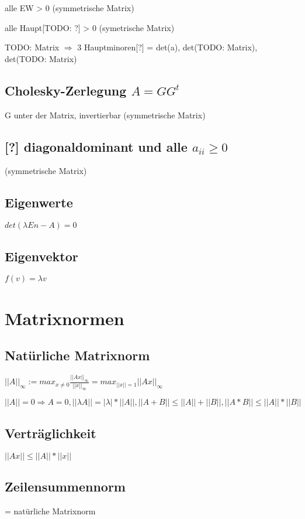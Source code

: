 \documentclass[12pt,a4paper]{article} %
\begin{document}
			alle EW > 0 (symmetrische Matrix)
			
			alle Haupt[TODO: ?] > 0 (symetrische Matrix)
			
			TODO: Matrix 	$\Rightarrow$ 3 Hauptminoren[?] = det(a), det(TODO: Matrix), det(TODO: Matrix)
			
			\subsection{Cholesky-Zerlegung $A = GG^t$}
			G unter der Matrix, invertierbar (symmetrische Matrix)
			
			\subsection{[?] diagonaldominant und alle $a_{ii} \ge 0$}
			(symmetrische Matrix)
			
			\subsection{Eigenwerte}
			$det(\lambda En - A) = 0$
			
			\subsection{Eigenvektor}
			$f(v) = \lambda v$
			
		\newpage
		
		\section{Matrixnormen}
		
		\subsection{Natürliche Matrixnorm}
		
		$||A||_\infty := max_{x \ne 0} \frac{||Ax||_\infty}{||x||_\infty} = max_{||x|| = 1}||Ax||_\infty$
		
		$||A|| = 0 \Rightarrow A = 0, ||\lambda A|| = |\lambda|*||A||, ||A+B|| \le ||A|| + ||B||, ||A*B|| \le ||A|| * ||B||$
		
		\subsection{Verträglichkeit}
		$||Ax|| \le ||A|| * ||x||$
		
		\subsection{Zeilensummennorm}
		= natürliche Matrixnorm
		
\end{document}

